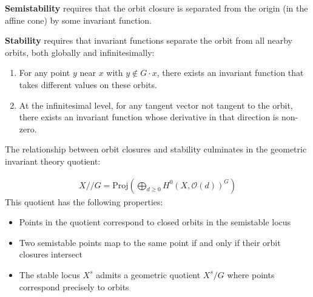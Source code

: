 \documentclass[12pt]{article}
\begin{document}
\begin{remark}
\textbf{Semistability} requires that the orbit closure is separated from the origin (in the affine cone) by some invariant function.

\textbf{Stability} requires that invariant functions separate the orbit from all nearby orbits, both globally and infinitesimally:

\begin{enumerate}
\item For any point $y$ near $x$ with $y \not\in G \cdot x$, there exists an invariant function that takes different values on these orbits.

\item At the infinitesimal level, for any tangent vector not tangent to the orbit, there exists an invariant function whose derivative in that direction is non-zero.
\end{enumerate}
\end{remark}


The relationship between orbit closures and stability culminates in the geometric invariant theory quotient:

\begin{align*}
    X//G = \text{Proj}\left(\bigoplus_{d \geq 0} H^0(X, \mathcal{O}(d))^G\right)
\end{align*}
This quotient has the following properties:

\begin{itemize}
\item Points in the quotient correspond to closed orbits in the semistable locus

\item Two semistable points map to the same point if and only if their orbit closures intersect

\item The stable locus $X^s$ admits a geometric quotient $X^s/G$ where points correspond precisely to orbits
\end{itemize}
\end{document}
